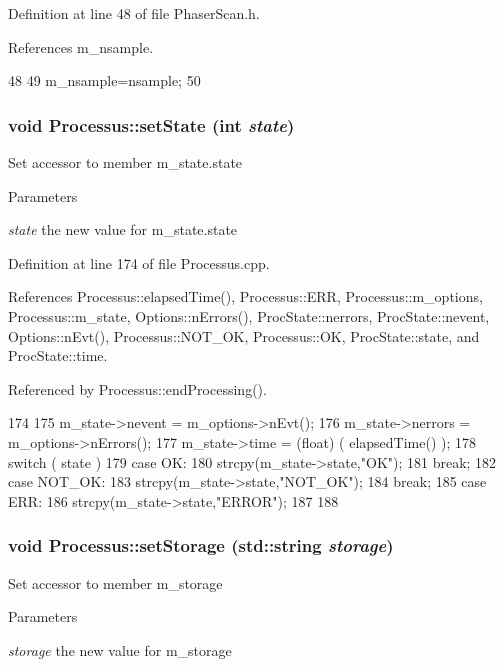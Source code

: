 Definition at line 48 of file PhaserScan.h.

References m\_\-nsample.


\begin{DoxyCode}
48                              {
49     m_nsample=nsample;
50   }
\end{DoxyCode}
\hypertarget{classProcessus_ad38cde0f1bcefa00b068e7947b8af927}{
\subsubsection[{setState}]{\setlength{\rightskip}{0pt plus 5cm}void Processus::setState (int {\em state})}}
\label{classProcessus_ad38cde0f1bcefa00b068e7947b8af927}
Set accessor to member m\_\-state.state 
\begin{DoxyParams}{Parameters}
\item[{\em state}]the new value for m\_\-state.state \end{DoxyParams}


Definition at line 174 of file Processus.cpp.

References Processus::elapsedTime(), Processus::ERR, Processus::m\_\-options, Processus::m\_\-state, Options::nErrors(), ProcState::nerrors, ProcState::nevent, Options::nEvt(), Processus::NOT\_\-OK, Processus::OK, ProcState::state, and ProcState::time.

Referenced by Processus::endProcessing().


\begin{DoxyCode}
174                                      {
175   m_state->nevent  = m_options->nEvt();
176   m_state->nerrors = m_options->nErrors();
177   m_state->time    = (float) ( elapsedTime() );
178   switch ( state ){
179   case OK:
180     strcpy(m_state->state,"OK");
181     break;
182   case NOT_OK:
183     strcpy(m_state->state,"NOT_OK");
184     break;
185   case ERR:
186     strcpy(m_state->state,"ERROR");
187   }
188 }
\end{DoxyCode}
\hypertarget{classProcessus_ad57a29b33f9021eda9f6929136f1784f}{
\subsubsection[{setStorage}]{\setlength{\rightskip}{0pt plus 5cm}void Processus::setStorage (std::string {\em storage})}}
\label{classProcessus_ad57a29b33f9021eda9f6929136f1784f}
Set accessor to member m\_\-storage 
\begin{DoxyParams}{Parameters}
\item[{\em storage}]the new value for m\_\-storage \end{DoxyParams}


